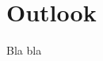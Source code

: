 \documentclass[b]{subfiles}
\begin{document}
\chapter{Outlook}
\begin{parsec}%
\begin{point}%
    Bla bla
\end{point}
\end{parsec}
\end{document}
